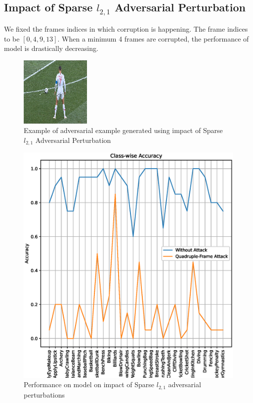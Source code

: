 \documentclass[10pt,twocolumn,letterpaper]{article}
\begin{document}
\subsection{Impact of Sparse $l_{2,1}$ Adversarial Perturbation}
We fixed the frames indices in which corruption is happening. The frame indices to be $[0,4,9,13]$. When a minimum 4 frames are corrupted, the performance of model is drastically decreasing.
\begin{figure}[!ht]
    \centering
    \includegraphics[width=0.5\columnwidth]{./Images/Adversarial-Attack.png}
    \caption{Example of adversarial example generated using impact of Sparse $l_{2,1}$ Adversarial Perturbation}
\end{figure}
\begin{figure}[!ht]
    \centering
    \includegraphics[width=\columnwidth]{./Images/Adversarial-Attack.eps}
    \caption{Performance on model on impact of Sparse $l_{2,1}$ adversarial perturbations}
\end{figure}


{\small


}
\end{document}

